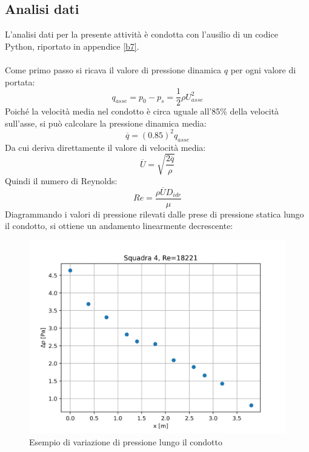 \subsection{Analisi dati}
L'analisi dati per la presente attività è condotta con l'ausilio di un codice Python, riportato in appendice \ref{b7}.\\\\
Come primo passo si ricava il valore di pressione dinamica $q$ per ogni valore di portata:
\begin{equation*}
    q_{asse} = p_0 - p_s = \frac12 \rho U_{asse}^2
\end{equation*}
Poiché la velocità media nel condotto è circa uguale all'85\% della velocità sull'asse, si può calcolare la pressione dinamica media:
\begin{equation*}
    \overline q = (0.85)^2 q_{asse} 
\end{equation*}
Da cui deriva direttamente il valore di velocità media:
\begin{equation*}
    \overline U = \sqrt{\frac{2\overline q}\rho}
\end{equation*}
Quindi il numero di Reynolds:
\begin{equation*}
    Re = \frac{\rho \overline U D_{idr}}{\mu}
\end{equation*}
Diagrammando i valori di pressione rilevati dalle prese di pressione statica lungo il condotto, si ottiene un andamento linearmente decrescente:
\begin{figure}[H]
    \centering
    \includegraphics[width=.65\textwidth]{images/7/p.png}
    \caption{Esempio di variazione di pressione lungo il condotto}
\end{figure}

